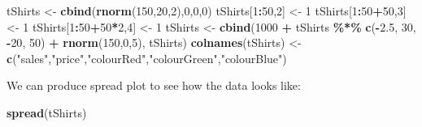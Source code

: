 \documentclass[
]{book}
\newenvironment{Shaded}{\begin{snugshade}}{\end{snugshade}}
\newcommand{\DecValTok}[1]{\textcolor[rgb]{0.00,0.00,0.81}{#1}}
\newcommand{\FloatTok}[1]{\textcolor[rgb]{0.00,0.00,0.81}{#1}}
\newcommand{\FunctionTok}[1]{\textcolor[rgb]{0.13,0.29,0.53}{\textbf{#1}}}
\newcommand{\NormalTok}[1]{#1}
\newcommand{\OtherTok}[1]{\textcolor[rgb]{0.56,0.35,0.01}{#1}}
\newcommand{\SpecialCharTok}[1]{\textcolor[rgb]{0.81,0.36,0.00}{\textbf{#1}}}
\newcommand{\StringTok}[1]{\textcolor[rgb]{0.31,0.60,0.02}{#1}}
\theoremstyle{definition}
\theoremstyle{definition}
\theoremstyle{definition}
\theoremstyle{definition}
\theoremstyle{remark}
\begin{document}
\begin{Shaded}
\begin{Highlighting}[]
\NormalTok{tShirts }\OtherTok{\textless{}{-}} \FunctionTok{cbind}\NormalTok{(}\FunctionTok{rnorm}\NormalTok{(}\DecValTok{150}\NormalTok{,}\DecValTok{20}\NormalTok{,}\DecValTok{2}\NormalTok{),}\DecValTok{0}\NormalTok{,}\DecValTok{0}\NormalTok{,}\DecValTok{0}\NormalTok{)}
\NormalTok{tShirts[}\DecValTok{1}\SpecialCharTok{:}\DecValTok{50}\NormalTok{,}\DecValTok{2}\NormalTok{] }\OtherTok{\textless{}{-}} \DecValTok{1}
\NormalTok{tShirts[}\DecValTok{1}\SpecialCharTok{:}\DecValTok{50}\SpecialCharTok{+}\DecValTok{50}\NormalTok{,}\DecValTok{3}\NormalTok{] }\OtherTok{\textless{}{-}} \DecValTok{1}
\NormalTok{tShirts[}\DecValTok{1}\SpecialCharTok{:}\DecValTok{50}\SpecialCharTok{+}\DecValTok{50}\SpecialCharTok{*}\DecValTok{2}\NormalTok{,}\DecValTok{4}\NormalTok{] }\OtherTok{\textless{}{-}} \DecValTok{1}
\NormalTok{tShirts }\OtherTok{\textless{}{-}} \FunctionTok{cbind}\NormalTok{(}\DecValTok{1000} \SpecialCharTok{+}\NormalTok{ tShirts }\SpecialCharTok{\%*\%} \FunctionTok{c}\NormalTok{(}\SpecialCharTok{{-}}\FloatTok{2.5}\NormalTok{, }\DecValTok{30}\NormalTok{, }\SpecialCharTok{{-}}\DecValTok{20}\NormalTok{, }\DecValTok{50}\NormalTok{) }\SpecialCharTok{+} \FunctionTok{rnorm}\NormalTok{(}\DecValTok{150}\NormalTok{,}\DecValTok{0}\NormalTok{,}\DecValTok{5}\NormalTok{), tShirts)}
\FunctionTok{colnames}\NormalTok{(tShirts) }\OtherTok{\textless{}{-}} \FunctionTok{c}\NormalTok{(}\StringTok{"sales"}\NormalTok{,}\StringTok{"price"}\NormalTok{,}\StringTok{"colourRed"}\NormalTok{,}\StringTok{"colourGreen"}\NormalTok{,}\StringTok{"colourBlue"}\NormalTok{)}
\end{Highlighting}
\end{Shaded}

We can produce spread plot to see how the data looks like:

\begin{Shaded}
\begin{Highlighting}[]
\FunctionTok{spread}\NormalTok{(tShirts)}
\end{Highlighting}
\end{Shaded}
\end{document}
